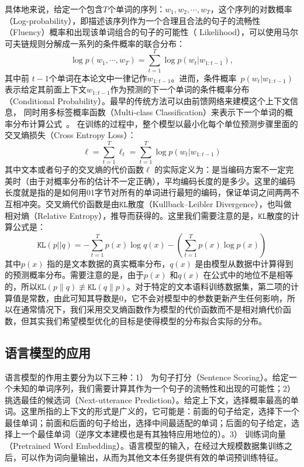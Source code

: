 具体地来说，给定一个包含$T$个单词的序列：$w_1,w_2,\cdots,w_T$，这个序列的对数概率（Log-probability），即描述该序列作为一个合理且合法的句子的流畅性（Fluency）概率和出现该单词组合的句子的可能性（ Likelihood），可以使用马尔可夫链规则分解成一系列的条件概率的联合分布：
\begin{equation}
\label{laguage_model}
 \log p(w_1,\cdots, w_T ) = \sum_{t=1}^T \log p(w_t | w_{1:t-1}),
\end{equation}
其中前 $t-1$个单词在本论文中一律记作$w_ {1:t-1}$。进而，条件概率~$p(w_t | w_ {1:t-1})$表示给定其前面上下文$w_ {1:t-1} $作为预测的下一个单词的条件概率分布（Conditional Probability）。最早的传统方法可以由前馈网络来建模这个上下文信息， 同时用多标签概率函数（Multi-class Classification）来表示下一个单词的概率分布计算公式~。 在训练的过程中，整个模型以最小化每个单位预测步骤里面的交叉熵损失（Cross Entropy Loss）：
\begin{equation}\label{equ:losses}
  \ell=\sum_{t=1}^{T}\ell_t=\sum_{t=1}^{T}\log p(w_t | w_{1:t-1})
\end{equation}
其中文本或者句子的交叉熵的代价函数$\ell$ 的实际定义为：是当编码方案不一定完美时（由于对概率分布的估计不一定正确），平均编码长度的是多少。这里的编码长度就是指的是如何用01字节对所有的单词进行最短的编码，保证单词之间两两不互相冲突。交叉熵代价函数是由$\texttt{KL}$散度（Kullback–Leibler Divergence），也叫做相对熵（Relative Entropy），推导而获得的。这里我们需要注意的是，$  \texttt{KL}$散度的计算公式是：
\begin{equation}\label{equ:losses}
  \texttt{KL}(p||q)=-\sum_{t=1}^{T}p(x)\log q(x) - (\sum_{t=1}^{T}p(x)\log p(x))
\end{equation}
其中$p(x)$ 指的是文本数据的真实概率分布，$q(x)$ 是由模型从数据中计算得到的预测概率分布。需要注意的是，由于$p(x)$ 和$q(x)$ 在公式中的地位不是相等的，所以$\texttt{KL} (p\parallel q)\not\equiv  \texttt{KL}  (q\parallel p)$。对于特定的文本语料训练数据集，第二项的计算值是常数，由此可知其导数是0，它不会对模型中的参数更新产生任何影响，所以在通常情况下，我们采用交叉熵函数作为模型的代价函数而不是相对熵代价函数，但其实我们希望模型优化的目标是使得模型的分布拟合实际的分布。
\subsection{语言模型的应用}
语言模型的作用主要分为以下三种：1） 为句子打分（Sentence Scoring）。给定一个未知的单词序列，我们需要计算其作为一个句子的流畅性和出现的可能性；2） 挑选最佳的候选词（Next-utterance Prediction）。给定上下文，选择概率最高的单词。这里所指的上下文的形式是广义的，它可能是：前面的句子给定，选择下一个最佳单词；前面和后面的句子给出，选择中间最适配的单词；后面的句子给定，选择上一个最佳单词（逆序文本建模也是有其独特应用地位的）。3） 训练词向量（Pretrained Word Embedding）。语言模型的输入，在经过大规模数据集训练之后，可以作为词向量输出，从而为其他文本任务提供有效的单词预训练特征。

